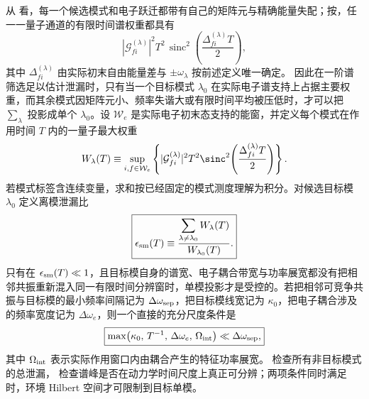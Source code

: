 从 看，每一个候选模式和电子跃迁都带有自己的矩阵元与精确能量失配；按，任一一量子通道的有限时间谱权重都具有
\begin{equation*}
\left|\mathcal G^{(\lambda)}_{fi}\right|^2
T^2\,\operatorname{sinc}^2\!\left(
\frac{\Delta^{(\lambda)}_{fi}T}{2}
\right),
\end{equation*}
其中 $\Delta^{(\lambda)}_{fi}$ 由实际初末自由能量差与 $\pm\omega_\lambda$ 按前述定义唯一确定。
因此在一阶谱筛选足以估计泄漏时，只有当一个目标模式 $\lambda_0$ 在实际电子谱支持上占据主要权重，而其余模式因矩阵元小、频率失谐大或有限时间平均被压低时，才可以把 $\sum_\lambda$ 投影成单个 $\lambda_0$。设 $\mathcal W_e$ 是实际电子初末态支持的能窗，并定义每个模式在作用时间 $T$ 内的一量子最大权重
\begin{equation*}
W_\lambda(T)
\equiv
\sup_{i,f\in\mathcal W_e}
\left\{
|\mathcal G_{fi}^{(\lambda)}|^2T^2
\sinc^2\!\left(\frac{\Delta_{fi}^{(\lambda)}T}{2}\right)
\right\}.
\end{equation*}
若模式标签含连续变量，求和按已经固定的模式测度理解为积分。对候选目标模 $\lambda_0$ 定义离模泄漏比
\begin{equation}
\boxed{
\epsilon_{\rm sm}(T)
\equiv
\frac{\displaystyle\sum_{\lambda\neq\lambda_0}W_\lambda(T)}
{W_{\lambda_0}(T)}.}
\label{eq:single_mode_finite_time_leakage}
\end{equation}
只有在 $\epsilon_{\rm sm}(T)\ll1$，且目标模自身的谱宽、电子耦合带宽与功率展宽都没有把相邻共振重新混入同一有限时间分辨窗时，单模投影才是受控的。若把相邻可竞争共振与目标模的最小频率间隔记为 $\Delta\omega_{\rm sep}$，把目标模线宽记为 $\kappa_0$，把电子耦合涉及的频率宽度记为 $\Delta\omega_e$，则一个直接的充分尺度条件是
\begin{equation}
\boxed{
\max\!\left(
\kappa_0,\,T^{-1},\,\Delta\omega_e,\,\Omega_{\rm int}
\right)
\ll\Delta\omega_{\rm sep},}
\label{eq:single_mode_spectral_isolation_condition}
\end{equation}
其中 $\Omega_{\rm int}$ 表示实际作用窗口内由耦合产生的特征功率展宽。 检查所有非目标模式的总泄漏， 检查谱峰是否在动力学时间尺度上真正可分辨；两项条件同时满足时，环境 Hilbert 空间才可限制到目标单模。

